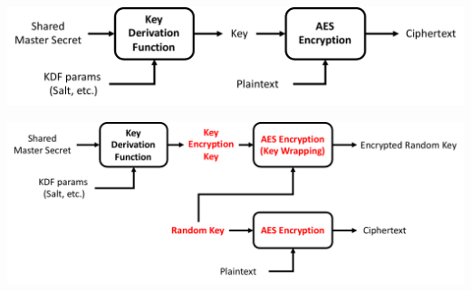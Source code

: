 \documentclass[12pt,dvipdfmx]{beamer}
\newcommand{\backupbegin}{
   \newcounter{framenumberappendix}
   \setcounter{framenumberappendix}{\value{framenumber}}
}
\newcommand{\backupend}{
   \addtocounter{framenumberappendix}{-\value{framenumber}}
   \addtocounter{framenumber}{\value{framenumberappendix}} 
}
\begin{document}
\begin{frame}
\begin{center}
\includegraphics[width=\linewidth]{Figs/ecdh02.pdf}
\end{center}
\end{frame}


\begin{frame}
\begin{center}
\includegraphics[width=\linewidth]{Figs/aeskw.pdf}
\end{center}
\end{frame}





 


\end{document}
